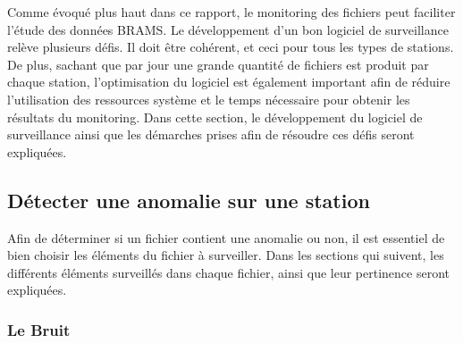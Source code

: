 \documentclass[11pt]{article}
\begin{document}
Comme évoqué plus haut dans ce rapport, le monitoring des fichiers peut faciliter l'étude des données BRAMS.
Le développement d'un bon logiciel de surveillance relève plusieurs défis.
Il doit être cohérent, et ceci pour tous les types de stations.
De plus, sachant que par jour une grande quantité de fichiers est produit par chaque station, l'optimisation du logiciel est également important afin de réduire l'utilisation des ressources système et le temps nécessaire pour obtenir les résultats du monitoring.
Dans cette section, le développement du logiciel de surveillance ainsi que les démarches prises afin de résoudre ces défis seront expliquées.

\subsection{Détecter une anomalie sur une station}

Afin de déterminer si un fichier contient une anomalie ou non, il est essentiel de bien choisir les éléments du fichier à surveiller.
Dans les sections qui suivent, les différents éléments surveillés dans chaque fichier, ainsi que leur pertinence seront expliquées.

\subsubsection{Le Bruit}
\end{document}
